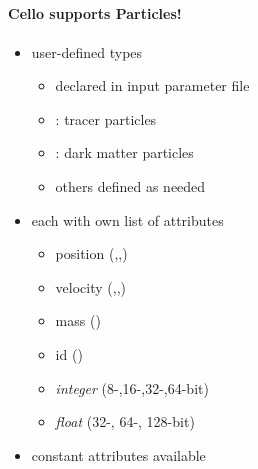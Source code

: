 \NEWSEC

\subsection{\ssRecentParticles}

\begin{frame}[fragile,label=ss-recent-particles] 
  \secframetitle{\ssRecentParticles}
  \framesubtitle{Cello supports Particles!}

\begin{minipage}{2.5in}
\begin{itemize}
\item user-defined types
\begin{itemize}
        \item  declared in input parameter file
        \item  {}: tracer particles
        \item  {}: dark matter particles
        \item  others defined as needed
\end{itemize}
\item each with own list of attributes
\begin{itemize}
        \item  position (,,)
        \item  velocity (,,)
        \item  mass ()
        \item  id ()
        \item \textit{integer} (8-,16-,32-,64-bit)
        \item \textit{float}   (32-, 64-, 128-bit)
        \end{itemize}
\item constant attributes available
\end{itemize}
\end{minipage} \
\begin{minipage}{2.0in}
\end{minipage}
\end{frame}


